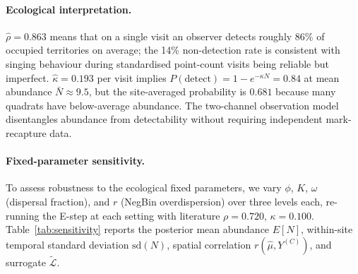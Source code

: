 \documentclass[review,12pt]{elsarticle}
\theoremstyle{definition}
\begin{document}
\paragraph{Ecological interpretation.}
$\hat\rho=0.863$ means that on a single visit an observer detects roughly
$86\%$ of occupied territories on average; the 14\% non-detection rate is
consistent with singing behaviour during standardised point-count visits
being reliable but imperfect.
$\hat\kappa=0.193$ per visit implies $P(\text{detect})=1-e^{-\kappa N}
=0.84$ at mean abundance $\bar N\approx9.5$, but the site-averaged
probability is $0.681$ because many quadrats have below-average abundance.
The two-channel observation model disentangles abundance from detectability
without requiring independent mark-recapture data.

\paragraph{Fixed-parameter sensitivity.}
To assess robustness to the ecological fixed parameters, we vary $\phi$,
$K$, $\omega$ (dispersal fraction), and $r$ (NegBin overdispersion)
over three levels each, re-running the E-step at each setting with
literature $\rho=0.720$, $\kappa=0.100$.
Table~\ref{tab:sensitivity} reports the posterior mean abundance $E[N]$,
within-site temporal standard deviation $\mathrm{sd}(N)$, spatial
correlation $r(\hat\mu, Y^{(C)})$, and surrogate $\tilde{\mathcal{L}}$.
\end{document}

